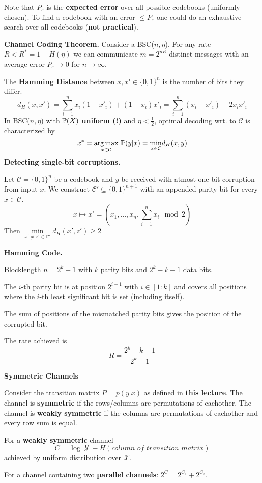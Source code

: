  Note that \(P_\varepsilon\) is the \textbf{expected error} over all possible codebooks (uniformly chosen). 
 To find a codebook with an error \(\leq P_\varepsilon\) one could do an exhaustive search over 
 all codebooks (\textbf{not practical}).

\vspace*{1mm}
 \textbf{Channel Coding Theorem.} Consider a BSC(\(n, \eta\)). For any rate \(R < R^* = 1- H(\eta)\) we can 
 communicate \(m = 2^{nR}\) distinct messages with an average error \(P_\varepsilon \to 0\) for \(n \to \infty\). 

 The \textbf{Hamming Distance} between \(x, x' \in \{0,1\}^n\) is the number of bits they differ.
 \[d_H(x, x') = \sum_{i = 1}^n x_i(1-x'_i)+(1-x_i)x'_i = \sum_{i = 1}^n (x_i + x'_i)-2x_ix'_i\]
In BSC(\(n, \eta\)) with \(\P(X)\) \textbf{uniform (!)} and \(\eta < \frac{1}{2}\), optimal 
decoding wrt. to \(\mathcal{C}\) is characterized by \[x^* = \underset{x \in \mathcal{C}}{\arg \max} \ \P(y|x) = \underset{x \in \mathcal{C}}{\min} d_H(x, y)\] 
\textbf{Detecting single-bit corruptions.}

Let \(\mathcal{C} = \{0, 1\}^n\) be a codebook and \(y\) be received with atmost one bit corruption from input \(x\).
We construct \(\mathcal{C}' \subseteq \{0,1\}^{n+1}\) with an appended parity bit for every \(x \in \mathcal{C}\).
\[x \mapsto x' = \left(x_1, ..., x_n, \sum_{i = 1}^n x_i \mod 2\right)\]
Then \(\underset{x'\neq z' \in \mathcal{C}'}{\min} d_H(x', z') \geq 2\)

\textbf{Hamming Code.}

Blocklength \(n = 2^k-1\) with \(k\) parity bits and \(2^k-k-1\) data bits. 

The \(i\)-th parity bit is at position \(2^{i-1}\) with \(i \in [1:k]\) and 
covers all positions where the \(i\)-th least significant bit is set (including itself).

The sum of positions of the mismatched parity bits gives the position of the corrupted bit.

The rate achieved is \[R = \frac{2^k-k-1}{2^k-1}\]

\textbf{Symmetric Channels}

Consider the transition matrix \(P = p(y|x)\) as defined in \textbf{this lecture}. The channel is 
\textbf{symmetric} if the rows/columns are permutations of eachother.
The channel is \textbf{weakly symmetric} if the columns are permutations of eachother and every row sum is equal.

For a \textbf{weakly symmetric} channel
\[C = \log |\mathcal{Y}| - H(\textit{column of transition matrix})\]
achieved by uniform distribution over \(\mathcal{X}\).

For a channel containing two \textbf{parallel channels}: \(2^C = 2^{C_1}+2^{C_2}\).